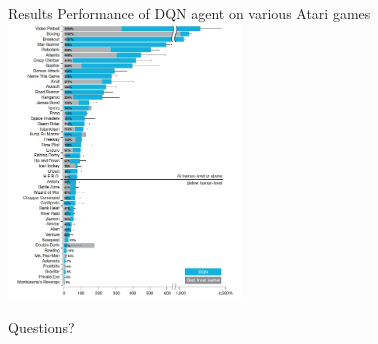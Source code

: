 \documentclass{beamer}
\begin{document}
\begin{frame}{Results}
\centering Performance of DQN agent on various Atari games
\includegraphics[width = 6.2cm]{Images/deepmind-dqn-perfomance.jpg}
\end{frame}
\begin{frame}[focus]
Questions?
\end{frame}
\end{document}
